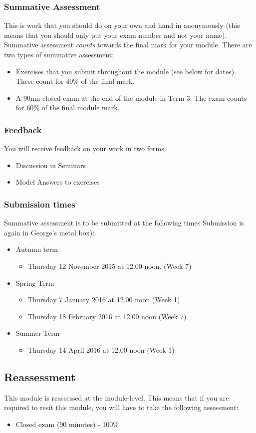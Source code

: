 \documentclass[12pt]{article}
\begin{document}
\subsubsection*{Summative Assessment} This is work that you should do on your own and hand in anonymously (this means that you should only put your exam number and not your name).  Summative assessment \textit{counts} towards the final mark for your module.  There are two types of summative assessment:
\begin{itemize}
\item Exercises that you submit throughout the module (see below for dates). These count for 40\% of the final mark.
\item A 90mn closed exam at the end of the module in Term 3.  The exam counts for 60\% of the final module mark. 
\end{itemize}
\subsubsection*{Feedback} You will receive feedback on your work in two forms.
\begin{itemize}
\item Discussion in Seminars
\item Model Answers to exercises
\end{itemize}
\subsubsection*{Submission times}
Summative assessment is to be submitted at the following times Submission is again in George's metal box):
\begin{itemize}
\item Autumn term
  \begin{itemize}
  \item Thursday 12 November 2015 at 12.00 noon.  (Week 7)
  \end{itemize}
\item Spring Term
  \begin{itemize}
  \item Thursday 7 January 2016 at 12.00 noon (Week 1)
  \item Thursday 18 February 2016 at 12.00 noon (Week 7)
  \end{itemize}
\item Summer Term
  \begin{itemize}
  \item Thursday 14 April 2016 at 12.00 noon (Week 1)
  \end{itemize}

\end{itemize}

\subsection{Reassessment}
This module is reassessed at the module-level. This means that if you are required to resit this module, you will have to take the following assessment:
\begin{itemize}
\item Closed exam (90 minutes) - 100\%
\end{itemize}
\end{document}
